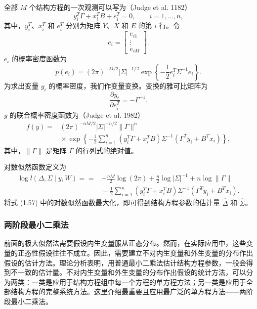 全部 $M$ 个结构方程的一次观测可以写为（Judge et al. 1182）
\begin{equation}
 y_i^{T}\Gamma+x_i^{T}B+e_i^{T}=0,\qquad i=1,\ldots,n,
 \tag{1.55}
\end{equation}
其中，$y_i^{T}$、$x_i^{T}$ 和 $e_i^{T}$ 分别为矩阵 $Y$、$X$ 和 $E$ 的第 $i$ 行。令
\[
 e_i=\begin{bmatrix}e_{i1}\\\vdots\\e_{iM}\end{bmatrix}.
\]
$e_i$ 的概率密度函数为
\[
 p(e_i)=(2\pi)^{-M/2}|\Sigma|^{-1/2}
       \exp\left\{-\frac12 e_i^{T}\Sigma^{-1}e_i\right\}.
\]
为求出变量 $y_i$ 的概率密度，我们作变量变换。变换的雅可比矩阵为
\[
 \frac{\partial y_i}{\partial e_i^{T}}=-\Gamma^{-1}.
\]
$y$ 的联合概率密度函数为（Judge et al. 1982）
\begin{equation}
 \begin{aligned}
 f(y)={}&(2\pi)^{-nM/2}|\Sigma|^{-n/2}\lVert\Gamma\rVert^{n}\\
 &{}\times\exp\left\{-\frac12\sum_{i=1}^{n}
 (y_i^{T}\Gamma+x_i^{T}B)\Sigma^{-1}
 (\Gamma^{T}y_i+B^{T}x_i)\right\},
 \end{aligned}
 \tag{1.56}
\end{equation}
其中，$\lVert\Gamma\rVert$ 是矩阵 $\Gamma$ 的行列式的绝对值。

对数似然函数定义为
\begin{equation}
 \begin{aligned}
 \log l(\Delta,\Sigma\mid y,W)
 \mathrel{==}{}&-\frac{nM}{2}\log(2\pi)
       +\frac n2\log|\Sigma|^{-1}+n\log\lVert\Gamma\rVert\\
 &{}-\frac12\sum_{i=1}^{n}(y_i^{T}\Gamma+x_i^{T}B)\Sigma^{-1}
           (\Gamma^{T}y_i+B^{T}x_i).
 \end{aligned}
 \tag{1.57}
\end{equation}
将式 (1.57) 中的对数似然函数最大化，即可得到结构方程参数的估计量 $\widehat\Delta$ 和 $\widehat\Sigma$。

\subsubsection{两阶段最小二乘法}

前面的极大似然法需要假设内生变量服从正态分布。然而，在实际应用中，这些变量的正态性假设往往不成立。因此，需要建立不对内生变量和外生变量的分布作出假设的估计方法。理论分析表明，用普通最小二乘法估计结构方程参数，一般会得到不一致的估计量。不对内生变量和外生变量的分布作出假设的统计方法，可以分为两类：一类是应用于结构方程组中每一个方程的单方程方法；另一类是应用于全部结构方程的完整系统方法。这里介绍最重要且应用最广泛的单方程方法——两阶段最小二乘法。

